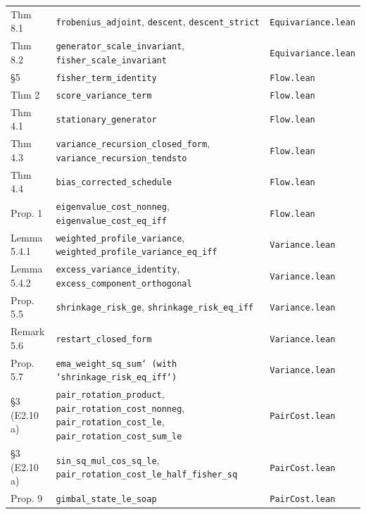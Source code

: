 \begin{tabular}{>{\raggedright\arraybackslash}p{2.6cm}>{\raggedright\arraybackslash}p{9.0cm}>{\raggedright\arraybackslash}p{3.2cm}}
Thm 8.1 & \texttt{frobenius\_adjoint}, \texttt{descent}, \texttt{descent\_strict} & \texttt{Equivariance.lean} \\
Thm 8.2 & \texttt{generator\_scale\_invariant}, \texttt{fisher\_scale\_invariant} & \texttt{Equivariance.lean} \\
§5 & \texttt{fisher\_term\_identity} & \texttt{Flow.lean} \\
Thm 2 & \texttt{score\_variance\_term} & \texttt{Flow.lean} \\
Thm 4.1 & \texttt{stationary\_generator} & \texttt{Flow.lean} \\
Thm 4.3 & \texttt{variance\_recursion\_closed\_form}, \texttt{variance\_recursion\_tendsto} & \texttt{Flow.lean} \\
Thm 4.4 & \texttt{bias\_corrected\_schedule} & \texttt{Flow.lean} \\
Prop. 1 & \texttt{eigenvalue\_cost\_nonneg}, \texttt{eigenvalue\_cost\_eq\_iff} & \texttt{Flow.lean} \\
Lemma 5.4.1 & \texttt{weighted\_profile\_variance}, \texttt{weighted\_profile\_variance\_eq\_iff} & \texttt{Variance.lean} \\
Lemma 5.4.2 & \texttt{excess\_variance\_identity}, \texttt{excess\_component\_orthogonal} & \texttt{Variance.lean} \\
Prop. 5.5 & \texttt{shrinkage\_risk\_ge}, \texttt{shrinkage\_risk\_eq\_iff} & \texttt{Variance.lean} \\
Remark 5.6 & \texttt{restart\_closed\_form} & \texttt{Variance.lean} \\
Prop. 5.7 & \texttt{ema\_weight\_sq\_sum` (with `shrinkage\_risk\_eq\_iff`)} & \texttt{Variance.lean} \\
§3 (E2.10 a) & \texttt{pair\_rotation\_product}, \texttt{pair\_rotation\_cost\_nonneg}, \texttt{pair\_rotation\_cost\_le}, \texttt{pair\_rotation\_cost\_sum\_le} & \texttt{PairCost.lean} \\
§3 (E2.10 a) & \texttt{sin\_sq\_mul\_cos\_sq\_le}, \texttt{pair\_rotation\_cost\_le\_half\_fisher\_sq} & \texttt{PairCost.lean} \\
Prop. 9 & \texttt{gimbal\_state\_le\_soap} & \texttt{PairCost.lean} \\
\bottomrule
\end{tabular}
